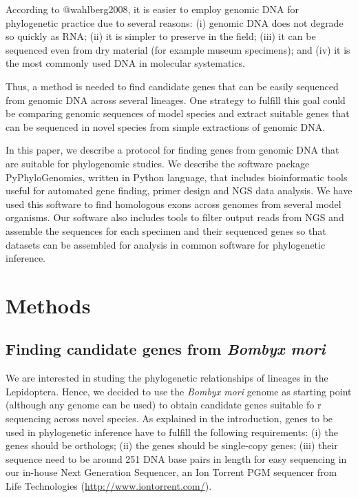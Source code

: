 \documentclass[]{article}
\begin{document}
According to @wahlberg2008, it is easier to employ genomic DNA for
phylogenetic practice due to several reasons: (i) genomic DNA does not
degrade so quickly as RNA; (ii) it is simpler to preserve in the field;
(iii) it can be sequenced even from dry material (for example museum
specimens); and (iv) it is the most commonly used DNA in molecular
systematics.

Thus, a method is needed to find candidate genes that can be easily
sequenced from genomic DNA across several lineages. One strategy to
fulfill this goal could be comparing genomic sequences of model species
and extract suitable genes that can be sequenced in novel species from
simple extractions of genomic DNA.

In this paper, we describe a protocol for finding genes from genomic DNA
that are suitable for phylogenomic studies. We describe the software
package PyPhyloGenomics, written in Python language, that includes
bioinformatic tools useful for automated gene finding, primer design and
NGS data analysis. We have used this software to find homologous exons
across genomes from several model organisms. Our software also includes
tools to filter output reads from NGS and assemble the sequences for
each specimen and their sequenced genes so that datasets can be
assembled for analysis in common software for phylogenetic inference.

\section{Methods}

\subsection{Finding candidate genes from \emph{Bombyx mori}}

We are interested in studing the phylogenetic relationships of lineages
in the Lepidoptera. Hence, we decided to use the \emph{Bombyx mori}
genome as starting point (although any genome can be used) to obtain
candidate genes suitable fo r sequencing across novel species. As
explained in the introduction, genes to be used in phylogenetic
inference have to fulfill the following requirements: (i) the genes
should be orthologs; (ii) the genes should be single-copy genes; (iii)
their sequence need to be around 251 DNA base pairs in length for easy
sequencing in our in-house Next Generation Sequencer, an Ion Torrent PGM
sequencer from Life Technologies (\url{http://www.iontorrent.com/}).
\end{document}
